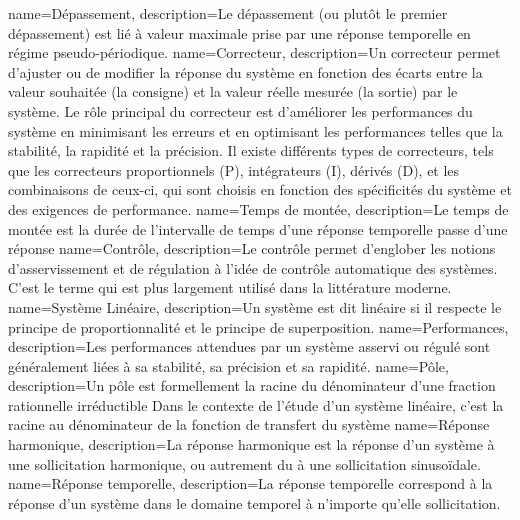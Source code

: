 %
{%
  name={Dépassement},%
  description={Le dépassement (ou plutôt le premier dépassement) 
  est lié à valeur maximale prise par une réponse temporelle en régime
  pseudo-périodique.  
  }
}
%
{%
  name={Correcteur},%
  description={Un correcteur permet d'ajuster ou 
               de modifier la réponse du système en fonction des écarts 
               entre la valeur souhaitée (la consigne) et la valeur 
               réelle mesurée (la sortie) par le système. Le rôle principal 
               du correcteur est d'améliorer les performances du système 
               en minimisant les erreurs et en optimisant les performances 
               telles que la stabilité, la rapidité et la précision. 
               Il existe différents types de correcteurs, tels que 
               les correcteurs proportionnels (P), 
               intégrateurs (I), dérivés (D), et les combinaisons de 
               ceux-ci, qui sont choisis en fonction des spécificités 
               du système et des exigences de performance.}
}
%
{%
  name={Temps de montée},%
  description={Le temps de montée est la durée de l'intervalle de temps d'une
  réponse temporelle passe d'une réponse 
  }
}
%
{%
  name={Contrôle},%
  description={Le contrôle permet d'englober les notions d'asservissement et
  de régulation à l'idée de contrôle automatique des systèmes. C'est le terme
  qui est plus largement utilisé dans la littérature moderne.  
  }
}
%
{%
  name={Système Linéaire},%
  description={Un système est dit linéaire si il respecte le principe
  de proportionnalité et le principe de superposition.
  }
}
%
{%
  name={Performances},%
  description={Les performances attendues par un système asservi ou régulé 
  sont généralement liées à sa stabilité, sa précision et sa rapidité.
  }
}
%
{%
  name={Pôle},%
  description={Un pôle est formellement la racine du dénominateur d'une
  fraction rationnelle irréductible Dans le contexte de l'étude d'un système
  linéaire, c'est la racine au dénominateur de
  la fonction de transfert du système
  }
}
%
{%
  name={Réponse harmonique},%
  description={La réponse harmonique est la réponse d'un système à une 
  sollicitation harmonique, ou autrement du à une sollicitation sinusoïdale.
  }
}
%
{%
  name={Réponse temporelle},%
  description={La réponse temporelle correspond à la réponse d'un système 
  dans le domaine temporel à n'importe qu'elle sollicitation.
  }
}
